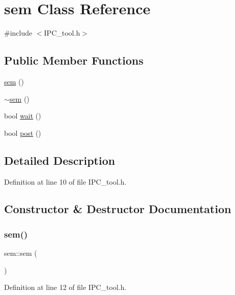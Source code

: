 \hypertarget{classsem}{}\section{sem Class Reference}
\label{classsem}


{\ttfamily \#include $<$I\+P\+C\+\_\+tool.\+h$>$}

\subsection*{Public Member Functions}
\begin{DoxyCompactItemize}
\item 
\hyperlink{classsem_afc49c4ced0a9986bf4b6da4f10d45a4b}{sem} ()
\item 
\hyperlink{classsem_a8e5210bd3255149e3a56d69dbc0cba60}{$\sim$sem} ()
\item 
bool \hyperlink{classsem_a0195e3b2273cb8d2c814778b0521e847}{wait} ()
\item 
bool \hyperlink{classsem_a258d9983b317cba4b528f6204545f849}{post} ()
\end{DoxyCompactItemize}


\subsection{Detailed Description}


Definition at line 10 of file I\+P\+C\+\_\+tool.\+h.



\subsection{Constructor \& Destructor Documentation}
\mbox{\label{classsem_afc49c4ced0a9986bf4b6da4f10d45a4b}} 
\subsubsection{\texorpdfstring{sem()}{sem()}}
{\footnotesize\ttfamily sem\+::sem (\begin{DoxyParamCaption}{ }\end{DoxyParamCaption})\hspace{0.3cm}{\ttfamily [inline]}}



Definition at line 12 of file I\+P\+C\+\_\+tool.\+h.

\mbox{\label{classsem_a8e5210bd3255149e3a56d69dbc0cba60}} 

